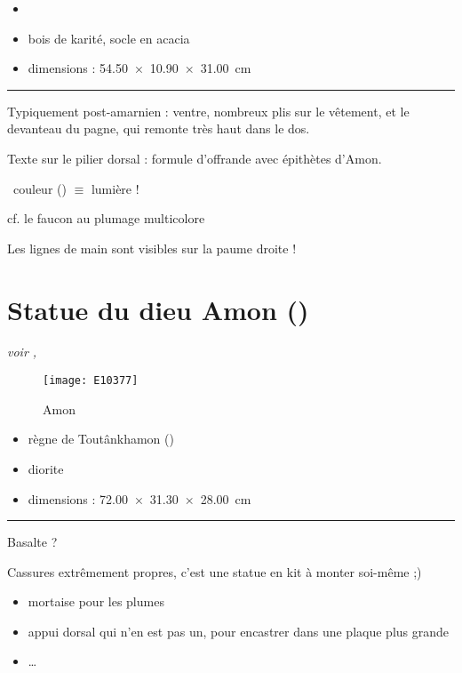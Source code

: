 \documentclass[dvipsnames,a4paper,twoside,10pt,openany,article]{memoir}
\newcommand{\separation}{%
  {\noi\hspace*{\fill}\rule{.33\textwidth}{1pt}\hspace*{\fill}}%
}
\begin{document}
\begin{itemize}
  \item {}
  \item bois de karité, socle en acacia
  \item dimensions : \SI{54.50x10.90x31.00}{\cm}
\end{itemize}

\separation

Typiquement post-amarnien : ventre, nombreux plis sur le vêtement, et 
le devanteau du pagne, qui remonte très haut dans le dos.

Texte sur le pilier dorsal : formule d'offrande avec épithètes d'Amon.

\quad\donc~couleur () $\equiv$ lumière !

\begin{remarque}
  cf. le \og faucon au plumage multicolore \fg
\end{remarque}

Les lignes de main sont visibles sur la paume droite !


\chapter{Statue du dieu Amon ()}
\label{sec:E10377}

\puceb{} \emph{voir , }
\bigskip

\begin{figure}[!h]
  \texttt{[image: E10377]}
  \caption{Amon }
  \label{fig:E10377}
\end{figure}

\begin{itemize}
  \item règne de Toutânkhamon ()
  \item diorite
  \item dimensions : \SI{72.00x31.30x28.00}{\cm}
\end{itemize}

\separation

Basalte ?

Cassures extrêmement propres, c'est une \og statue en kit à 
monter soi-même \fg ;)

\begin{itemize}
  \item mortaise pour les plumes
  \item appui dorsal qui n'en est pas un, pour encastrer dans 
        une plaque plus grande
  \item \dots
\end{itemize}
\end{document}
